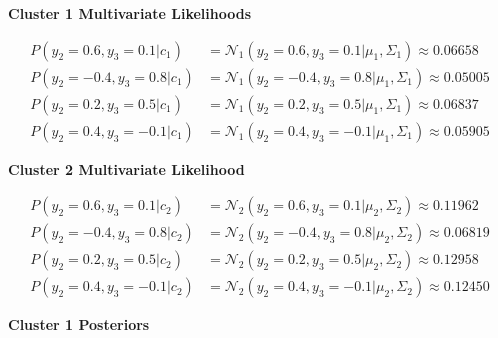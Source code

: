 \documentclass[12pt]{article}
\begin{document}
\begin{enumerate}[leftmargin=\labelsep]
          \begin{center}
              \textbf{\colorbox{bmint}{Cluster 1 Multivariate Likelihoods}}
          \end{center}

          \vskip -0.7cm
          \begingroup
          \addtolength{\jot}{0.5em}
          \begin{align*}
              P(y_2=0.6, y_3=0.1 | c_1) & = \mathcal{N}_1(y_2=0.6, y_3=0.1|\mu_1, \Sigma_1) \approx 0.06658 \\
              P(y_2=-0.4, y_3=0.8 | c_1) & = \mathcal{N}_1(y_2=-0.4, y_3=0.8|\mu_1, \Sigma_1) \approx 0.05005 \\
              P(y_2=0.2, y_3=0.5 | c_1) & = \mathcal{N}_1(y_2=0.2, y_3=0.5|\mu_1, \Sigma_1) \approx 0.06837 \\
              P(y_2=0.4, y_3=-0.1 | c_1) & = \mathcal{N}_1(y_2=0.4, y_3=-0.1|\mu_1, \Sigma_1) \approx 0.05905
          \end{align*}
          \endgroup

          \begin{center}
              \textbf{\colorbox{byellow}{Cluster 2 Multivariate Likelihood}}
          \end{center}

          \vskip -0.7cm
          \begingroup
          \addtolength{\jot}{0.5em}
          \begin{align*}
              P(y_2=0.6, y_3=0.1 | c_2) & = \mathcal{N}_2(y_2=0.6, y_3=0.1|\mu_2, \Sigma_2) \approx 0.11962 \\
              P(y_2=-0.4, y_3=0.8 | c_2) & = \mathcal{N}_2(y_2=-0.4, y_3=0.8|\mu_2, \Sigma_2) \approx 0.06819 \\
              P(y_2=0.2, y_3=0.5 | c_2) & = \mathcal{N}_2(y_2=0.2, y_3=0.5|\mu_2, \Sigma_2) \approx 0.12958 \\
              P(y_2=0.4, y_3=-0.1 | c_2) & = \mathcal{N}_2(y_2=0.4, y_3=-0.1|\mu_2, \Sigma_2) \approx 0.12450
          \end{align*}
          \endgroup

          \begin{center}
              \textbf{\colorbox{bmint}{Cluster 1 Posteriors}}
          \end{center}


\end{enumerate}
\end{document}
